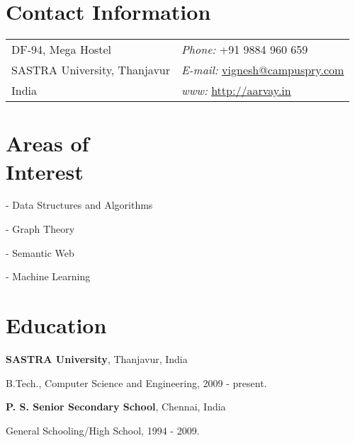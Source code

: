 	\begin{resume}
		\section{\sc Contact Information}
			\vspace{.05in}
			\begin{tabular}{@{}p{2in}p{4in}}
				DF-94, Mega Hostel   & {\it Phone:}  +91 9884 960 659 \\
				SASTRA University, Thanjavur & {\it E-mail:} \href{mailto:vignesh@campuspry.com}{vignesh@campuspry.com}\\
				India  & {\it www:} \href{http://aarvay.in}{http://aarvay.in} \\
			\end{tabular}
		
		\section{\sc Areas of \\Interest}
			\begin{list2}
				\item[-] Data Structures and Algorithms
		 		\item[-] Graph Theory
		 		\item[-] Semantic Web
		 		\item[-] Machine Learning
			\end{list2}
		
		\section{\sc Education}
			{\bf \textsf{SASTRA University}}, Thanjavur, India\\
			\vspace*{-.1in}
			\begin{list1}
				\item[] B.Tech., Computer Science and Engineering, 2009 - present.
			\end{list1}			
			{\bf \textsf{P. S. Senior Secondary School}}, Chennai, India\\
			\vspace*{-.1in}
			\begin{list1}
				\item[] General Schooling/High School, 1994 - 2009.
			\end{list1}
		

\end{resume}
